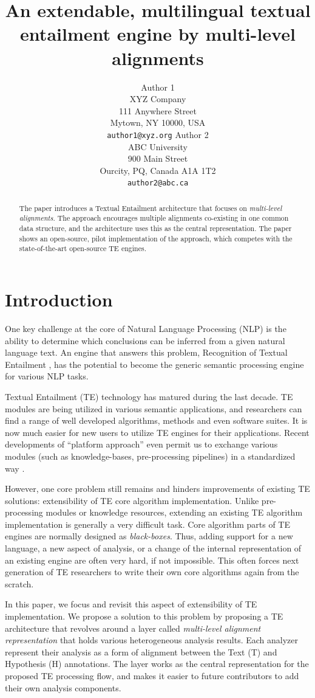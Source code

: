 \documentclass[11pt,letterpaper]{article}
\title{An extendable, multilingual textual entailment engine by
  multi-level alignments}
\author{Author 1\\
	    XYZ Company\\
	    111 Anywhere Street\\
	    Mytown, NY 10000, USA\\
	    {\tt author1@xyz.org}
	  \And
	Author 2\\
  	ABC University\\
  	900 Main Street\\
  	Ourcity, PQ, Canada A1A 1T2\\
  {\tt author2@abc.ca}}
\date{}
\begin{document}
\maketitle
\begin{abstract}
The paper introduces a Textual Entailment architecture that focuses
on {\em multi-level alignments}. The approach encourages multiple
alignments co-existing in one common data structure, and the
architecture uses this as the central representation. The paper shows
an open-source, pilot implementation of the approach, which competes
with the state-of-the-art open-source TE engines.  
\end{abstract}

\section{Introduction}
One key challenge at the core of Natural Language Processing (NLP) is
the ability to determine which conclusions can be inferred from a
given natural language text. An engine that answers this problem,
Recognition of Textual Entailment \cite{}, has the potential to
become the generic semantic processing engine for various NLP tasks.     

Textual Entailment (TE) technology has matured during the last
decade. TE modules are being utilized in various semantic
applications, and researchers can find a range of well developed
algorithms, methods and even software suites. It is now much easier
for new users to utilize TE engines for their applications. Recent 
developments of ``platform approach'' even permit us to exchange
various modules (such as knowledge-bases, pre-processing pipelines) in
a standardized way \cite{EOP-arch}. 

However, one core problem still remains and hinders improvements of  
existing TE solutions: extensibility of TE core algorithm
implementation. Unlike pre-processing modules or knowledge resources,   
extending an existing TE algorithm implementation is generally a very
difficult task. Core algorithm parts of TE engines are normally
designed as {\em black-boxes}. Thus, adding support for a new
language, a new aspect of analysis, or a change of the internal
representation of an existing engine are often very hard, if not
impossible. This often forces next generation of TE researchers to
write their own core algorithms again from the scratch.

In this paper, we focus and revisit this aspect of extensibility of TE
implementation. We propose a solution to this problem by proposing a 
TE architecture that revolves around a layer called {\em multi-level
  alignment representation} that holds various heterogeneous analysis
results. Each analyzer represent their analysis as a form of alignment
between the Text (T) and Hypothesis (H) annotations. The layer works
as the central representation for the proposed TE processing flow, and
makes it easier to future contributors to add their own analysis
components. 
\end{document}
